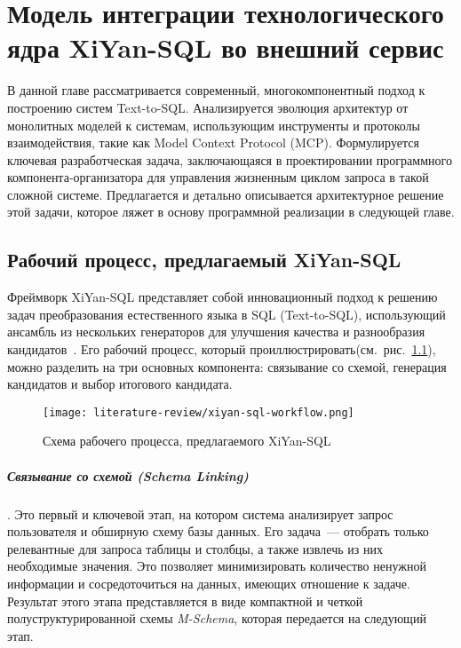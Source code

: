 \chapter{Модель интеграции технологического ядра
  XiYan-SQL во внешний сервис}\label{chapter2}

\begin{annotation}
	В данной главе рассматривается современный, многокомпонентный подход к построению систем Text-to-SQL. Анализируется эволюция архитектур от монолитных моделей к системам, использующим инструменты и протоколы взаимодействия, такие как Model Context Protocol (MCP). Формулируется ключевая разработческая задача, заключающаяся в проектировании программного компонента-организатора для управления жизненным циклом запроса в такой сложной системе. Предлагается и детально описывается архитектурное решение этой задачи, которое ляжет в основу программной реализации в следующей главе.
\end{annotation}




\section{Рабочий процесс, предлагаемый XiYan-SQL}\label{sec:xiyan_workflow}

Фреймворк XiYan-SQL представляет собой инновационный подход к решению задач преобразования
естественного языка в SQL (Text-to-SQL), использующий ансамбль из нескольких
генераторов для улучшения качества и разнообразия кандидатов~\cite{gaoPreviewXiYanSQLMultiGenerator2025}.
Его рабочий процесс, который проиллюстрировать(см.~рис.~\ref{fig:xiyan-sql-workflow}),
можно разделить на три основных компонента: связывание со схемой, генерация кандидатов и
выбор итогового кандидата.

\begin{figure}[!htb]
	\centering
	\texttt{[image: literature-review/xiyan-sql-workflow.png]}
	\caption{Схема рабочего процесса, предлагаемого XiYan-SQL}
	\label{fig:xiyan-sql-workflow}
\end{figure}


\paragraph{Связывание со схемой (Schema Linking)}. Это первый и ключевой этап, на котором
система анализирует запрос пользователя и обширную схему базы данных.
Его задача~--- отобрать только релевантные для запроса таблицы и столбцы,
а также извлечь из них необходимые значения. Это позволяет минимизировать количество
ненужной информации и сосредоточиться на данных, имеющих отношение к задаче.
Результат этого этапа представляется в виде компактной и четкой
полуструктурированной схемы \textit{M-Schema}, которая передается на следующий этап.


